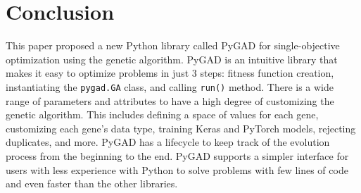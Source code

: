 \documentclass[conference]{IEEEtran}
\begin{document}
\section{Conclusion}
\label{conclusion}

This paper proposed a new Python library called PyGAD for single-objective optimization using the genetic algorithm. PyGAD is an intuitive library that makes it easy to optimize problems in just 3 steps: fitness function creation, instantiating the \texttt{pygad.GA} class, and calling \texttt{run()} method. There is a wide range of parameters and attributes to have a high degree of customizing the genetic algorithm. This includes defining a space of values for each gene, customizing each gene's data type, training Keras and PyTorch models, rejecting duplicates, and more. PyGAD has a lifecycle to keep track of the evolution process from the beginning to the end. PyGAD supports a simpler interface for users with less experience with Python to solve problems with few lines of code and even faster than the other libraries. 


%
%

\end{document}
